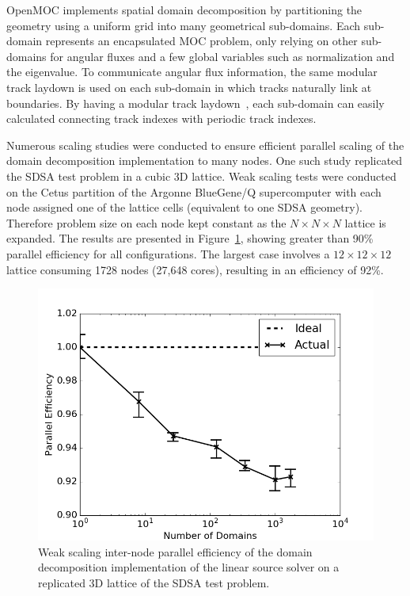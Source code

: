 \documentclass[12pt,twoside]{mitthesis-exec}
\begin{document}
OpenMOC implements spatial domain decomposition by partitioning the geometry using a uniform grid into many geometrical sub-domains. Each sub-domain represents an encapsulated MOC problem, only relying on other sub-domains for angular fluxes and a few global variables such as normalization and the eigenvalue. To communicate angular flux information, the same modular track laydown is used on each sub-domain in which tracks naturally link at boundaries. By having a modular track laydown~\cite{liu_mrt}, each sub-domain can easily calculated connecting track indexes with periodic track indexes.

Numerous scaling studies were conducted to ensure efficient parallel scaling of the domain decomposition implementation to many nodes. One such study replicated the SDSA test problem in a cubic 3D lattice. Weak scaling tests were conducted on the Cetus partition of the Argonne BlueGene/Q supercomputer with each node assigned one of the lattice cells (equivalent to one SDSA geometry). Therefore problem size on each node kept constant as the $N \times N \times N$ lattice is expanded. The results are presented in Figure~\ref{fig:dd-ws-3D}, showing greater than 90\% parallel efficiency for all configurations. The largest case involves a $12 \times 12 \times 12$ lattice consuming 1728 nodes (27,648 cores), resulting in an efficiency of 92\%.
	
\begin{figure}[h!]
	\centering
	\includegraphics[width=0.75\linewidth]{figures/DD/dd-ws-3D.png}
	\caption[]{Weak scaling inter-node parallel efficiency of the domain decomposition implementation of the linear source solver on a replicated 3D lattice of the SDSA test problem.}
	\label{fig:dd-ws-3D}
\end{figure}

\end{document}
